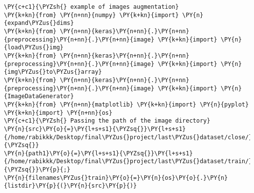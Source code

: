     \begin{tcolorbox}[breakable, size=fbox, boxrule=1pt, pad at break*=1mm,colback=cellbackground, colframe=cellborder]
\begin{Verbatim}[commandchars=\\\{\}]
\PY{c+c1}{\PYZsh{} example of images augmentation}
\PY{k+kn}{from} \PY{n+nn}{numpy} \PY{k+kn}{import} \PY{n}{expand\PYZus{}dims}
\PY{k+kn}{from} \PY{n+nn}{keras}\PY{n+nn}{.}\PY{n+nn}{preprocessing}\PY{n+nn}{.}\PY{n+nn}{image} \PY{k+kn}{import} \PY{n}{load\PYZus{}img}
\PY{k+kn}{from} \PY{n+nn}{keras}\PY{n+nn}{.}\PY{n+nn}{preprocessing}\PY{n+nn}{.}\PY{n+nn}{image} \PY{k+kn}{import} \PY{n}{img\PYZus{}to\PYZus{}array}
\PY{k+kn}{from} \PY{n+nn}{keras}\PY{n+nn}{.}\PY{n+nn}{preprocessing}\PY{n+nn}{.}\PY{n+nn}{image} \PY{k+kn}{import} \PY{n}{ImageDataGenerator}
\PY{k+kn}{from} \PY{n+nn}{matplotlib} \PY{k+kn}{import} \PY{n}{pyplot}
\PY{k+kn}{import} \PY{n+nn}{os}
\PY{c+c1}{\PYZsh{} Passing the path of the image directory}
\PY{n}{src}\PY{o}{=}\PY{l+s+s1}{\PYZsq{}}\PY{l+s+s1}{/home/rabikkk/Desktop/final\PYZus{}project/last\PYZus{}dataset/close/}\PY{l+s+s1}{\PYZsq{}}
\PY{n}{path1}\PY{o}{=}\PY{l+s+s1}{\PYZsq{}}\PY{l+s+s1}{/home/rabikkk/Desktop/final\PYZus{}project/last\PYZus{}dataset/train/}\PY{l+s+s1}{\PYZsq{}}\PY{p}{;}
\PY{n}{filenames\PYZus{}train}\PY{o}{=}\PY{n}{os}\PY{o}{.}\PY{n}{listdir}\PY{p}{(}\PY{n}{src}\PY{p}{)}


\end{Verbatim}
\end{tcolorbox}
